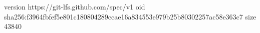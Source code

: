 version https://git-lfs.github.com/spec/v1
oid sha256:f3964fbfef5e801c180804289ccae16a834553e979b25b80302257ac58e363c7
size 43840
